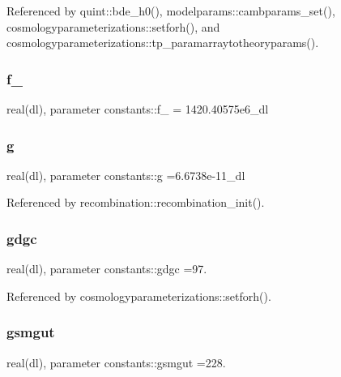 Referenced by quint\+::bde\+\_\+h0(), modelparams\+::cambparams\+\_\+set(), cosmologyparameterizations\+::setforh(), and cosmologyparameterizations\+::tp\+\_\+paramarraytotheoryparams().

\mbox{\label{namespaceconstants_aacc448f4915bb510b8d82376e8bd6963}} 
\subsubsection{\texorpdfstring{f\+\_\+21cm}{f\_21cm}}
{\footnotesize\ttfamily real(dl), parameter constants\+::f\+\_\+21cm = 1420.\+40575e6\+\_\+dl}

\mbox{\label{namespaceconstants_aa3593b18a3808f0dc490d4473e3f3108}} 
\subsubsection{\texorpdfstring{g}{g}}
{\footnotesize\ttfamily real(dl), parameter constants\+::g =6.\+6738e-\/11\+\_\+dl}



Referenced by recombination\+::recombination\+\_\+init().

\mbox{\label{namespaceconstants_aefb1fbd7d2a9301d11f96442b19574ad}} 
\subsubsection{\texorpdfstring{gdgc}{gdgc}}
{\footnotesize\ttfamily real(dl), parameter constants\+::gdgc =97.}



Referenced by cosmologyparameterizations\+::setforh().

\mbox{\label{namespaceconstants_afdb0b847eec17b604f3def40b5cdf8be}} 
\subsubsection{\texorpdfstring{gsmgut}{gsmgut}}
{\footnotesize\ttfamily real(dl), parameter constants\+::gsmgut =228.}



